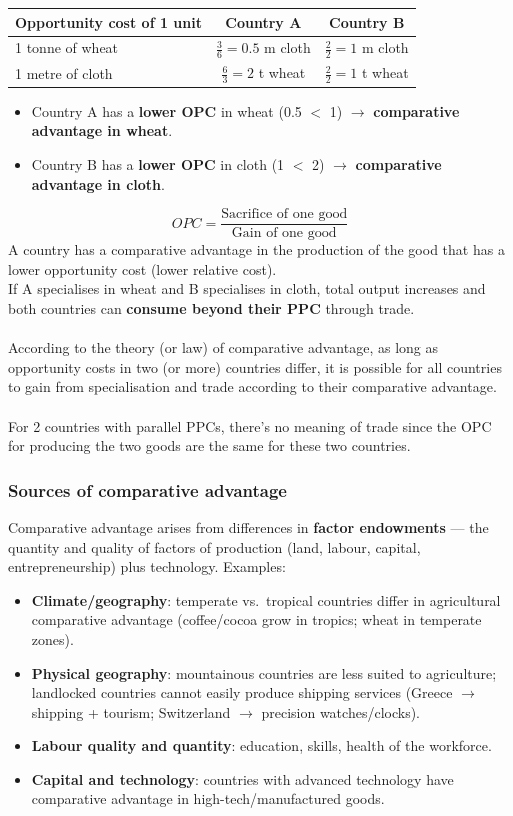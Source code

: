 \documentclass[a4paper,12pt]{article}
\begin{document}
\begin{center}
\begin{tabular}{lcc}
\toprule
\textbf{Opportunity cost of 1 unit} & \textbf{Country A} & \textbf{Country B} \\
\midrule
1 tonne of wheat & $\frac{3}{6} = 0.5$ m cloth & $\frac{2}{2} = 1$ m cloth \\
1 metre of cloth & $\frac{6}{3} = 2$ t wheat & $\frac{2}{2} = 1$ t wheat \\
\bottomrule
\end{tabular}
\end{center}
\begin{itemize}
  \item Country A has a \textbf{lower OPC} in wheat (0.5 $<$ 1) $\to$ \textbf{comparative advantage in wheat}.
  \item Country B has a \textbf{lower OPC} in cloth (1 $<$ 2) $\to$ \textbf{comparative advantage in cloth}.
\end{itemize}
\[OPC=\dfrac{\text{Sacrifice of one good}}{\text{Gain of one good}}\]
A country has a comparative advantage in the production of the good that has a lower opportunity cost (lower relative cost). \\
If A specialises in wheat and B specialises in cloth, total output increases and both countries can \textbf{consume beyond their PPC} through trade. \\\\
According to the theory (or law) of comparative advantage, as long as opportunity costs in two (or more) countries differ, it is possible for all countries to gain from specialisation and trade according to their comparative advantage. \\\\
For 2 countries with parallel PPCs, there's no meaning of trade since the OPC for producing the two goods are the same for these two countries.
\subsubsection*{Sources of comparative advantage}
Comparative advantage arises from differences in \textbf{factor endowments} --- the quantity and quality of factors of production (land, labour, capital, entrepreneurship) plus technology. Examples:
\begin{itemize}
  \item \textbf{Climate/geography}: temperate vs.\ tropical countries differ in agricultural comparative advantage (coffee/cocoa grow in tropics; wheat in temperate zones).
  \item \textbf{Physical geography}: mountainous countries are less suited to agriculture; landlocked countries cannot easily produce shipping services (Greece $\to$ shipping + tourism; Switzerland $\to$ precision watches/clocks).
  \item \textbf{Labour quality and quantity}: education, skills, health of the workforce.
  \item \textbf{Capital and technology}: countries with advanced technology have comparative advantage in high-tech/manufactured goods.
\end{itemize}
\end{document}
